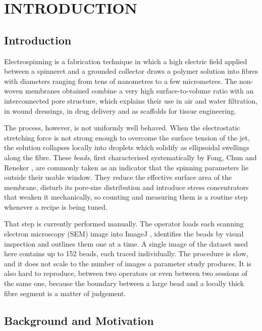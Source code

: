 \chapter{INTRODUCTION}
\label{ch:introduction}

\section{Introduction}

Electrospinning is a fabrication technique in which a high electric field applied
between a spinneret and a grounded collector draws a polymer solution into fibres
with diameters ranging from tens of nanometres to a few micrometres. The non-woven
membranes obtained combine a very high surface-to-volume ratio with an interconnected
pore structure, which explains their use in air and water filtration, in wound
dressings, in drug delivery and as scaffolds for tissue engineering.

The process, however, is not uniformly well behaved. When the electrostatic
stretching force is not strong enough to overcome the surface tension of the jet, the
solution collapses locally into droplets which solidify as ellipsoidal swellings
along the fibre. These \emph{beads}, first characterised systematically by
Fong, Chun and Reneker \cite{fong1999beaded}, are commonly taken as an indicator
that the spinning parameters lie outside their usable window. They reduce the
effective surface area of the membrane, disturb its pore-size distribution and
introduce stress concentrators that weaken it mechanically, so counting and
measuring them is a routine step whenever a recipe is being tuned.

That step is currently performed manually. The operator loads each scanning
electron microscopy (SEM) image into ImageJ \cite{schindelin2012fiji},
identifies the beads by visual inspection and outlines them one at a time. A
single image of the dataset used here contains up to 152 beads, each traced
individually. The procedure is slow, and it does not scale to the number of
images a parameter study produces. It is also hard to reproduce, between two
operators or even between two sessions of the same one, because the boundary
between a large bead and a locally thick fibre segment is a matter of
judgement.

\section{Background and Motivation}

